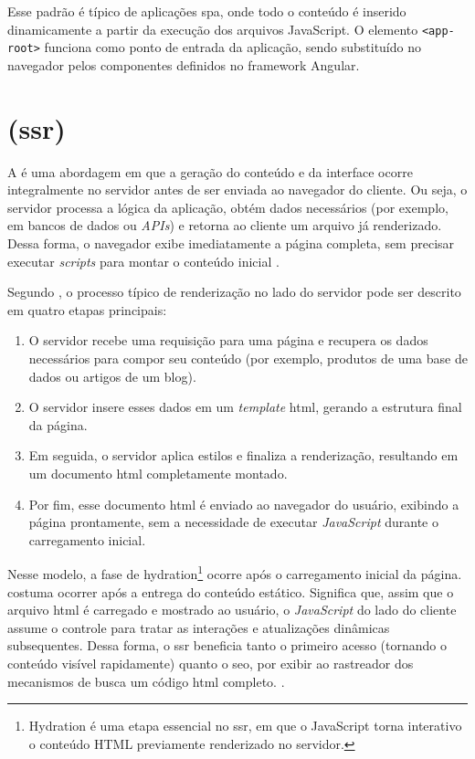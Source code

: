 Esse padrão é típico de aplicações \acrshort{spa}, onde todo o conteúdo é inserido dinamicamente a partir da execução dos arquivos JavaScript. O elemento \texttt{<app-root>} funciona como ponto de entrada da aplicação, sendo substituído no navegador pelos componentes definidos no framework Angular. {\cite{atori2024}}


\section{ (\acrshort{ssr})}
\label{subsec:ssr}

A \textbf{} é uma abordagem em que a geração do conteúdo e da interface ocorre integralmente no servidor antes de ser enviada ao navegador do cliente. Ou seja, o servidor processa a lógica da aplicação, obtém dados necessários (por exemplo, em bancos de dados ou \emph{APIs}) e retorna ao cliente um arquivo  já renderizado. Dessa forma, o navegador exibe imediatamente a página completa, sem precisar executar \emph{scripts} para montar o conteúdo inicial \cite{atori2024}. 

Segundo , o processo típico de renderização no lado do servidor pode ser descrito em quatro etapas principais:

\begin{enumerate}
    \item O servidor recebe uma requisição para uma página e recupera os dados necessários para compor seu conteúdo (por exemplo, produtos de uma base de dados ou artigos de um blog).
    \item O servidor insere esses dados em um \emph{template} \acrshort{html}, gerando a estrutura final da página.
    \item Em seguida, o servidor aplica estilos e finaliza a renderização, resultando em um documento \acrshort{html} completamente montado.
    \item Por fim, esse documento \acrshort{html} é enviado ao navegador do usuário, exibindo a página prontamente, sem a necessidade de executar \emph{JavaScript} durante o carregamento inicial.
\end{enumerate}

Nesse modelo, a fase de hydration\footnote{Hydration é uma etapa essencial no \acrshort{ssr}, em que o JavaScript torna interativo o conteúdo HTML previamente renderizado no servidor.} ocorre após o carregamento inicial da página. costuma ocorrer após a entrega do conteúdo estático. Significa que, assim que o arquivo \acrshort{html} é carregado e mostrado ao usuário, o \emph{JavaScript} do lado do cliente assume o controle para tratar as interações e atualizações dinâmicas subsequentes. Dessa forma, o \acrshort{ssr} beneficia tanto o primeiro acesso (tornando o conteúdo visível rapidamente) quanto o \acrshort{seo}, por exibir ao rastreador dos mecanismos de busca um código \acrshort{html} completo. \cite{atori2024}.

